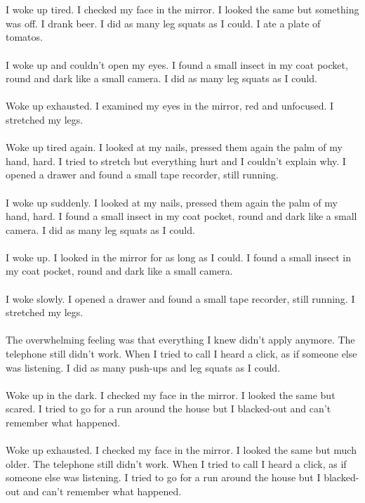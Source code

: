 \documentclass{article}
\begin{document}
    \section{}
    I woke up tired. I checked my face in the mirror. I looked the same but something was off. I drank beer. I did as many leg squats as I could. I ate a plate of tomatos. \\\\I woke up and couldn't open my eyes. I found a small insect in my coat pocket, round and dark like a small camera. I did as many leg squats as I could. \\\\Woke up exhausted. I examined my eyes in the mirror, red and unfocused. I stretched my legs. \\\\Woke up tired again. I looked at my nails, pressed them again the palm of my hand, hard. I tried to stretch but everything hurt and I couldn't explain why. I opened a drawer and found a small tape recorder, still running. \\\\I woke up suddenly. I looked at my nails, pressed them again the palm of my hand, hard. I found a small insect in my coat pocket, round and dark like a small camera. I did as many leg squats as I could. \\\\I woke up. I looked in the mirror for as long as I could. I found a small insect in my coat pocket, round and dark like a small camera. \\\\I woke slowly. I opened a drawer and found a small tape recorder, still running. I stretched my legs. \\\\The overwhelming feeling was that everything I knew didn't apply anymore. The telephone still didn't work. When I tried to call I heard a click, as if someone else was listening. I did as many push-ups and leg squats as I could. \\\\Woke up in the dark. I checked my face in the mirror. I looked the same but scared. I tried to go for a run around the house but I blacked-out and can't remember what happened. \\\\Woke up exhausted. I checked my face in the mirror. I looked the same but much older. The telephone still didn't work. When I tried to call I heard a click, as if someone else was listening. I tried to go for a run around the house but I blacked-out and can't remember what happened. \\\\
    \newpage
    
\end{document}
